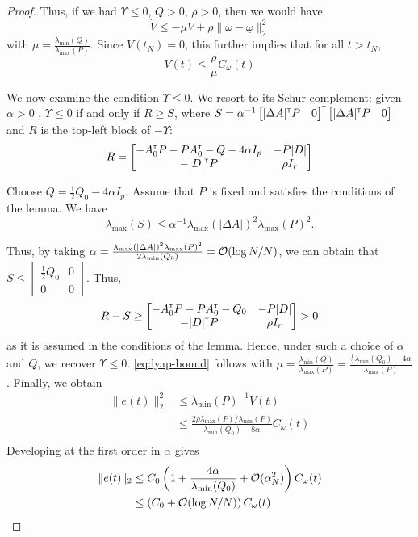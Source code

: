 \begin{subappendices}
\begin{proof}
		Thus, if we had $\Upsilon \leq 0$, $Q>0$, $\rho > 0$, then we would have
		\[
		\dot{V} \leq -\mu V + \rho \|\overline{\omega} - \underline{\omega}\|_2^2
		\]
		with $\mu = \frac{\lambda_{\min}(Q)}{\lambda_{\max}(P)}$. Since $V(t_N) = 0$, this further implies that for all $t>t_N$, 
		\begin{equation}
		\label{eq:lyap-bound}
		V(t) \leq \frac{\rho}{\mu} C_\omega(t)
		\end{equation}
		
		We now examine the condition $\Upsilon \leq 0$.
		We resort to its Schur complement: given $\alpha > 0$ , $\Upsilon \leq 0$ if and only if $R \geq S$, where $S= \alpha^{-1}\begin{bmatrix}|\Delta A|^{\mathsf{\scriptscriptstyle T}} P & 0\end{bmatrix}^{\mathsf{\scriptscriptstyle T}} \begin{bmatrix}|\Delta A|^{\mathsf{\scriptscriptstyle T}} P & 0\end{bmatrix}$ and $R$ is the top-left block of $-\Upsilon$:
		\[R = \begin{bmatrix}
		-A_0^{\mathsf{\scriptscriptstyle T}} P - P A_0^{\mathsf{\scriptscriptstyle T}} - Q - 4\alpha I_p & -P|D|\\
		-|D|^{\mathsf{\scriptscriptstyle T}} P & \rho I_r\\
		\end{bmatrix}\]
		
		Choose $Q = \frac{1}{2}Q_0-4\alpha I_p$.
		Assume that $P$ is fixed and satisfies the conditions of the lemma. We have $$\lambda_{\max}(S) \leq \alpha^{-1}\lambda_{\max}(|\Delta A|)^2\lambda_{\max}(P)^2.$$
		
		Thus, by taking $\alpha = \frac{\lambda_{\max}(|\Delta A|)^2\lambda_{\max}(P)^2}{2\lambda_{\min}(Q_0)} = \mathcal{O}(\log N / N)$, we can obtain that $S \leq \begin{bmatrix}
		\frac{1}{2}Q_0 & 0\\0 & 0
		\end{bmatrix}$. Thus,
		\[R-S \geq \begin{bmatrix}
		-A_0^{\mathsf{\scriptscriptstyle T}} P - P A_0^{\mathsf{\scriptscriptstyle T}} - Q_0 & -P|D|\\
		-|D|^{\mathsf{\scriptscriptstyle T}} P & \rho I_r\\
		\end{bmatrix} > 0 \]
		as it is assumed in the conditions of the lemma. Hence, under such a choice of $\alpha$ and $Q$, we recover $\Upsilon\leq 0$. \eqref{eq:lyap-bound} follows with $\mu = \frac{\lambda_{\min}(Q)}{\lambda_{\max}(P)} = \frac{\frac{1}{2}\lambda_{\min}(Q_0) - 4\alpha}{\lambda_{\max}(P)}$.
		Finally, we obtain
		\begin{align*}
		\|e(t)\|_2^2 &\leq \lambda_{\min}(P)^{-1} V(t)\\
		& \leq \frac{2\rho\lambda_{\max}(P)/\lambda_{\min}(P)}{\lambda_{\min}(Q_0) - 8\alpha} C_\omega(t)\\
		\end{align*}
		Developing at the first order in $\alpha$ gives
		\begin{align*}
		\|e(t)\|_2 &\leq C_0\left(1 + \frac{4\alpha}{\lambda_{\min}(Q_0)} + \mathcal{O}(\alpha_N^2)\right)C_\omega(t)\\
		&\leq \left(C_0 + \mathcal{O}(\log N/N)\right)C_\omega(t)
		\end{align*}
	\end{proof}
	

\end{subappendices}
